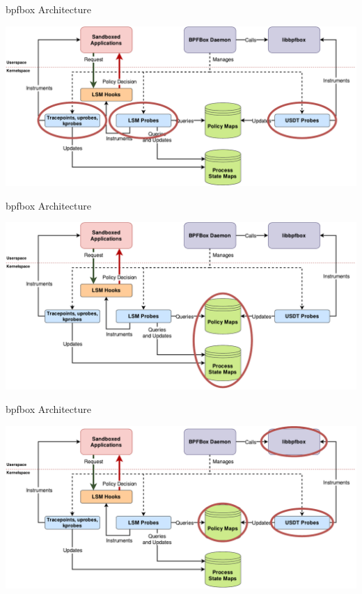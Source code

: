 \documentclass[12pt, dvipsnames, aspectratio=169]{beamer}
\begin{document}
\begin{frame}[c, noframenumbering]{bpfbox Architecture}
\begin{center}
    \color{black}
    \includegraphics[width=1\textwidth]{figs/bpfbox-overview-1.pdf}
\end{center}
\end{frame}

\begin{frame}[c, noframenumbering]{bpfbox Architecture}
\begin{center}
    \color{black}
    \vspace{0.55em}
    \includegraphics[width=1\textwidth]{figs/bpfbox-overview-2.pdf}
\end{center}
\end{frame}

\begin{frame}[c, noframenumbering]{bpfbox Architecture}
\begin{center}
    \color{black}
    \vspace{-0.2em}
    \includegraphics[width=1\textwidth]{figs/bpfbox-overview-3.pdf}
\end{center}
\end{frame}
\end{document}
